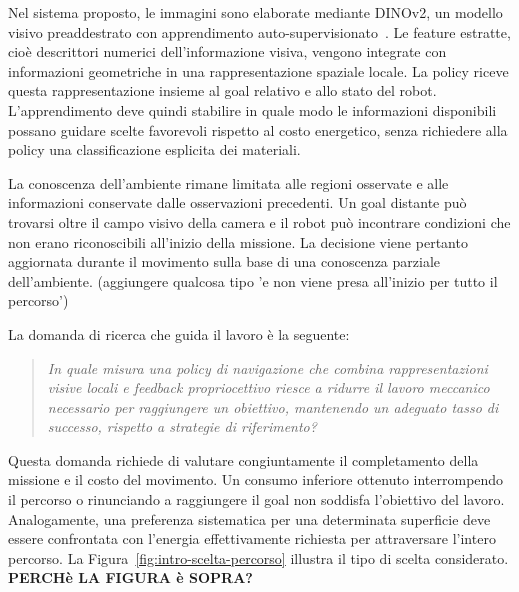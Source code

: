 Nel sistema proposto, le immagini sono elaborate mediante DINOv2, un modello visivo preaddestrato con apprendimento auto-supervisionato~\citep{Oquab2023DINOv2}. Le feature estratte, cioè descrittori numerici dell'informazione visiva, vengono integrate con informazioni geometriche in una rappresentazione spaziale locale. La policy riceve questa rappresentazione insieme al goal relativo e allo stato del robot. L'apprendimento deve quindi stabilire in quale modo le informazioni disponibili possano guidare scelte favorevoli rispetto al costo energetico, senza richiedere alla policy una classificazione esplicita dei materiali.

La conoscenza dell'ambiente rimane limitata alle regioni osservate e alle informazioni conservate dalle osservazioni precedenti. Un goal distante può trovarsi oltre il campo visivo della camera e il robot può incontrare condizioni che non erano riconoscibili all'inizio della missione. La decisione viene pertanto aggiornata durante il movimento sulla base di una conoscenza parziale dell'ambiente. (aggiungere qualcosa tipo 'e non viene presa all'inizio per tutto il percorso')

La domanda di ricerca che guida il lavoro è la seguente:

\begin{quote}
\emph{In quale misura una policy di navigazione che combina rappresentazioni visive locali e feedback propriocettivo riesce a ridurre il lavoro meccanico necessario per raggiungere un obiettivo, mantenendo un adeguato tasso di successo, rispetto a strategie di riferimento?}
\end{quote}

Questa domanda richiede di valutare congiuntamente il completamento della missione e il costo del movimento. Un consumo inferiore ottenuto interrompendo il percorso o rinunciando a raggiungere il goal non soddisfa l'obiettivo del lavoro. Analogamente, una preferenza sistematica per una determinata superficie deve essere confrontata con l'energia effettivamente richiesta per attraversare l'intero percorso. La Figura~\ref{fig:intro-scelta-percorso} illustra il tipo di scelta considerato. \textbf{PERCHè LA FIGURA  è SOPRA?}

